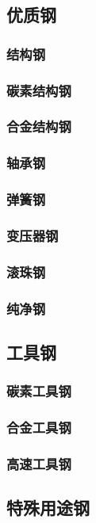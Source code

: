 \documentclass[UTF8]{../../ApplicationUniverse}
\begin{document}
    \subsection{优质钢}
        \subsubsection{结构钢}
        \subsubsection{碳素结构钢}
        \subsubsection{合金结构钢}
        \subsubsection{轴承钢}
        \subsubsection{弹簧钢}
        \subsubsection{变压器钢}
        \subsubsection{滚珠钢}
        \subsubsection{纯净钢}
    \subsection{工具钢}
        \subsubsection{碳素工具钢}
        \subsubsection{合金工具钢}
        \subsubsection{高速工具钢}
    \subsection{特殊用途钢}
\end{document}
